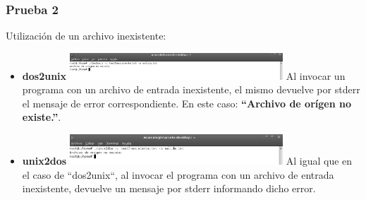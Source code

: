 \documentclass[a4paper,10pt]{article}
\begin{document}
    \subsubsection{Prueba 2}
    Utilizaci\'on de un archivo inexistente:
      \begin{itemize}
      \item \textbf{dos2unix}
      \newline
      \includegraphics[width=8cm, viewport=0 0 1168 147]{../Informe/Imagenes/prueba2-archivo-dos2unix.png}
      \newline
      Al invocar un programa con un archivo de entrada inexistente, el mismo devuelve por stderr el mensaje de error correspondiente.
      En este caso: {\bf ``Archivo de or\'igen no existe.''}.
      
      \item \textbf{unix2dos}
      \newline
      \includegraphics[width=8cm, viewport=0 0 895 128]{../Informe/Imagenes/prueba2-archivo-unix2dos.png}
      \newline
      Al igual que en el caso de ``dos2unix``, al invocar el programa con un archivo de entrada inexistente, devuelve un mensaje por stderr
      informando dicho error.
      
      \end{itemize}
\end{document}

